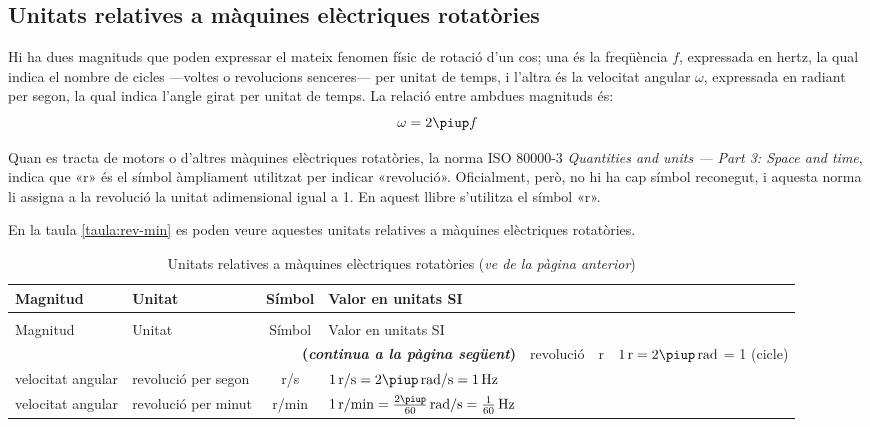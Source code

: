 \subsection{Unitats relatives a màquines elèctriques rotatòries}\label{sec:unit-maq-rotativ}

Hi ha dues magnituds que poden expressar el mateix fenomen físic de rotació d'un cos; una és la freqüència $f$, expressada en hertz, la qual indica el nombre de cicles ---voltes o revolucions senceres--- per unitat de temps, i l'altra és la velocitat angular $\omega$, expressada en radiant per segon, la qual indica l'angle girat per unitat de temps. La relació entre ambdues magnituds és:
\begin{equation}
  \omega = 2 \piup f
\end{equation}

Quan es tracta de motors o d'altres màquines elèctriques rotatòries, la norma ISO 80000-3 \textit{Quantities and units --- Part 3: Space and time}, indica que «r» és el símbol àmpliament utilitzat per indicar  «revolució».  Oficialment, però, no hi ha cap símbol reconegut, i aquesta norma li assigna a la revolució la unitat  adimensional igual a 1. En aquest llibre s'utilitza el símbol «r».

En la taula \vref{taula:rev-min} es poden veure aquestes unitats relatives a màquines elèctriques rotatòries.

\begin{longtable}[h]{llcl}
   \caption{\label{taula:rev-min} Unitats relatives a màquines elèctriques rotatòries}\\
   \toprule[1pt]
    Magnitud & Unitat &  Símbol & Valor en unitats SI \\
   \midrule
   \endfirsthead
   \caption[]{Unitats relatives a màquines elèctriques rotatòries (\emph{ve de la pàgina anterior})}\\
   \toprule[1pt]
    Magnitud & Unitat &  Símbol & Valor en unitats SI \\
   \midrule
   \endhead
   \midrule
   \multicolumn{4}{r}{\sffamily\bfseries\color{NavyBlue}(\emph{continua a la pàgina següent})}
   \endfoot
   \endlastfoot
   angle pla & revolució &  \unit{r} & $\qty{1}{r} = 2\piup\unit{\,rad}$  = 1 (cicle)\\
   velocitat angular & revolució per segon &  \unit{r/s}& $\qty{1}{r/s} = 2\piup\unit{\,rad/s} = \qty{1}{Hz}$  \\
   velocitat angular & revolució per minut &  \unit{r/min}& $\qty{1}{r/min} = \frac{2\piup}{60}\unit{\,rad/s} = \frac{1}{60}\unit{\,Hz}$  \\
   \bottomrule[1pt]
\end{longtable}


